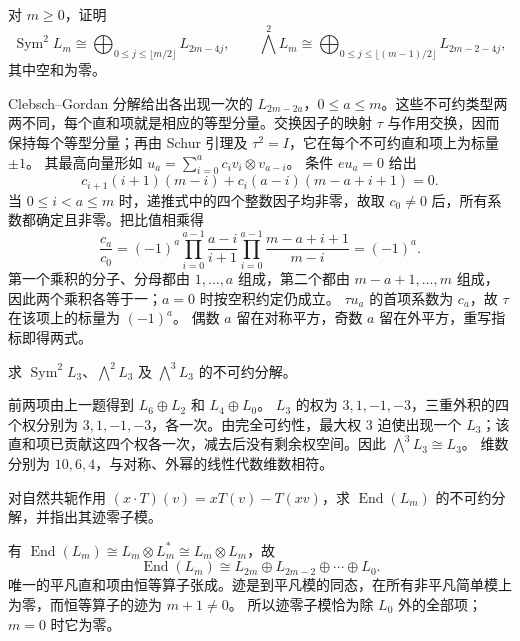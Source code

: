 \begin{exercise}\label{b5:ex:14-symmetric-exterior}
	对 \(m\geq0\)，证明
	\[
		\operatorname{Sym}^2L_m\cong \bigoplus_{0\leq j\leq\lfloor m/2\rfloor}L_{2m-4j}, \qquad \bigwedge^2L_m\cong \bigoplus_{0\leq j\leq\lfloor(m-1)/2\rfloor}L_{2m-2-4j},
	\]
	其中空和为零。
\end{exercise}
\begin{solution}
	Clebsch--Gordan 分解给出各出现一次的 \(L_{2m-2a}\)，\(0\leq a\leq m\)。这些不可约类型两两不同，每个直和项就是相应的等型分量。交换因子的映射 \(\tau\) 与作用交换，因而保持每个等型分量；再由 Schur 引理及 \(\tau^2=I\)，它在每个不可约直和项上为标量 \(\pm1\)。 其最高向量形如 \(u_a=\sum_{i=0}^a c_i v_i\otimes v_{a-i}\)。 条件 \(eu_a=0\) 给出
	\[
		c_{i+1}(i+1)(m-i) +c_i(a-i)(m-a+i+1)=0.
	\]
	当 \(0\le i<a\le m\) 时，递推式中的四个整数因子均非零，故取 \(c_0\ne0\) 后，所有系数都确定且非零。把比值相乘得
	\[
		\frac{c_a}{c_0}=(-1)^a \prod_{i=0}^{a-1}\frac{a-i}{i+1} \prod_{i=0}^{a-1}\frac{m-a+i+1}{m-i}=(-1)^a.
	\]
	第一个乘积的分子、分母都由 \(1,\ldots,a\) 组成，第二个都由 \(m-a+1,\ldots,m\) 组成，因此两个乘积各等于一；\(a=0\) 时按空积约定仍成立。 \(\tau u_a\) 的首项系数为 \(c_a\)，故 \(\tau\) 在该项上的标量为 \((-1)^a\)。 偶数 \(a\) 留在对称平方，奇数 \(a\) 留在外平方，重写指标即得两式。
\end{solution}

\begin{exercise}\label{b5:ex:14-small-exterior}
	求 \(\operatorname{Sym}^2L_3\)、\(\bigwedge^2L_3\) 及 \(\bigwedge^3L_3\) 的不可约分解。
\end{exercise}
\begin{solution}
	前两项由上一题得到 \(L_6\oplus L_2\) 和 \(L_4\oplus L_0\)。 \(L_3\) 的权为 \(3,1,-1,-3\)，三重外积的四个权分别为 \(3,1,-1,-3\)，各一次。由完全可约性，最大权 \(3\) 迫使出现一个 \(L_3\)；该直和项已贡献这四个权各一次，减去后没有剩余权空间。因此 \(\bigwedge^3L_3\cong L_3\)。 维数分别为 \(10,6,4\)，与对称、外幂的线性代数维数相符。
\end{solution}

\begin{exercise}\label{b5:ex:14-endomorphism-module}
	对自然共轭作用 \((x\cdot T)(v)=xT(v)-T(xv)\)，求 \(\operatorname{End}(L_m)\) 的不可约分解，并指出其迹零子模。
\end{exercise}
\begin{solution}
	有 \(\operatorname{End}(L_m)\cong L_m\otimes L_m^*\cong L_m\otimes L_m\)，故
	\[
		\operatorname{End}(L_m)\cong L_{2m}\oplus L_{2m-2}\oplus\cdots\oplus L_0.
	\]
	唯一的平凡直和项由恒等算子张成。迹是到平凡模的同态，在所有非平凡简单模上为零，而恒等算子的迹为 \(m+1\ne0\)。 所以迹零子模恰为除 \(L_0\) 外的全部项；\(m=0\) 时它为零。
\end{solution}

